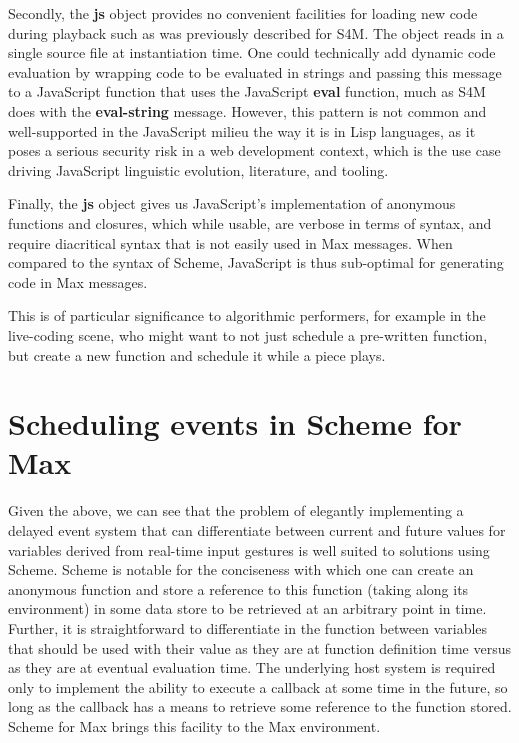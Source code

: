 \documentclass[acmsmall]{acmart}
\begin{document}
Secondly, the \textbf{js} object provides no convenient facilities for loading new code
during playback such as was previously described for S4M.
The object reads in a single source file at instantiation time.
One could technically add dynamic code evaluation by wrapping
code to be evaluated in strings and passing this message to a JavaScript function
that uses the JavaScript \textbf{eval} function, much as S4M does with the
\textbf{eval-string} message. However, this pattern is not common and well-supported
in the JavaScript milieu the way it is in Lisp languages, as it poses a serious security risk in a 
web development context, which is the use case driving JavaScript linguistic
evolution, literature, and tooling.

Finally, the \textbf{js} object gives us JavaScript's implementation of anonymous functions
and closures, which while usable, are verbose in terms of syntax, and require
diacritical syntax that is not easily used in Max messages. When compared to the syntax
of Scheme, JavaScript is thus sub-optimal for generating code in Max messages.

This is of particular significance to algorithmic performers, 
for example in the live-coding scene, who might
want to not just schedule a pre-written function, but create a new function 
and schedule it while a piece plays.


\section{Scheduling events in Scheme for Max}

Given the above, we can see that the problem of elegantly implementing 
a delayed event system that can differentiate between current and future values
for variables derived from real-time input gestures is well suited to solutions 
using Scheme. Scheme is notable for the conciseness with which one can create an anonymous function
and store a reference to this function (taking along its environment) in some data
store to be retrieved at an arbitrary point in time. Further, it is straightforward
to differentiate in the function between variables that should
be used with their value as they are at function definition time versus
as they are at eventual evaluation time. The underlying host system is required only to 
implement the ability to execute a callback at some time in the future, so long as 
the callback has a means to retrieve some reference to the function stored.
Scheme for Max brings this facility to the Max environment.
\end{document}
